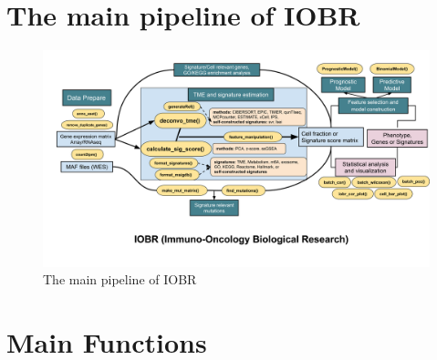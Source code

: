 \documentclass[
  12pt,
]{book}
\begin{document}
\hypertarget{the-main-pipeline-of-iobr}{%
\section{The main pipeline of IOBR}\label{the-main-pipeline-of-iobr}}

\begin{figure}

{\centering \includegraphics[width=0.95\linewidth]{./fig/IOBR-Package} 

}

\caption{The main pipeline of IOBR}\label{fig:flowchart}
\end{figure}

\hypertarget{main-functions}{%
\section{Main Functions}\label{main-functions}}
\end{document}
